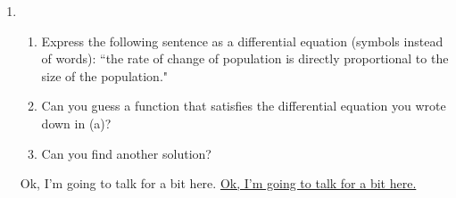 \documentclass[12pt]{article}
\providecommand{\redtext}[1]{{\color{BrickRed}   #1}}
\providecommand{\privatetextnoblank}[1]{%
\ifbool{showanswers}
	{%
		\redtext{#1}
	}%
	{%
		 {\color{white} \uline{ \LARGE #1} }
	}%
}%
\begin{document}
\begin{enumerate}
{Ok, great. Well, why would anyone care? It turns out that often we can reason out properties of the rate of change of a quantity of interest without being able say directly anything about the quantity itself. That might sound a bit weird, but think about gravity. Physicists tell us that everything on earth accelerates at the same rate--that tells us something about the rate of change of velocity. If it happens that velocity is what we happen to care about--that fits this situation. Let's go one simpler and talk about population. Let's start with the basic idea that the more people there are, the faster the population ought to be growing. That's a little informal, so let's try and take that idea and turn it into useful information. Which brings us to the next question... I've written out in fancy talk the idea that ``the more people there are, the faster the population is growing." I want you to try and write an equation that reflects that idea. }

\newpage
\begin{center}
\underline{Population Modeling}
\end{center}
\item \begin{enumerate}
\item Express the following sentence as a differential equation (symbols instead of words): ``the rate of change of population is directly proportional to the size of the population."
\item Can you guess a function that satisfies the differential equation you wrote down in (a)? 
\item Can you find another solution? 
\end{enumerate}
\privatetextnoblank{ Ok, I'm going to talk for a bit here. 
}
\end{enumerate}
\end{document}
